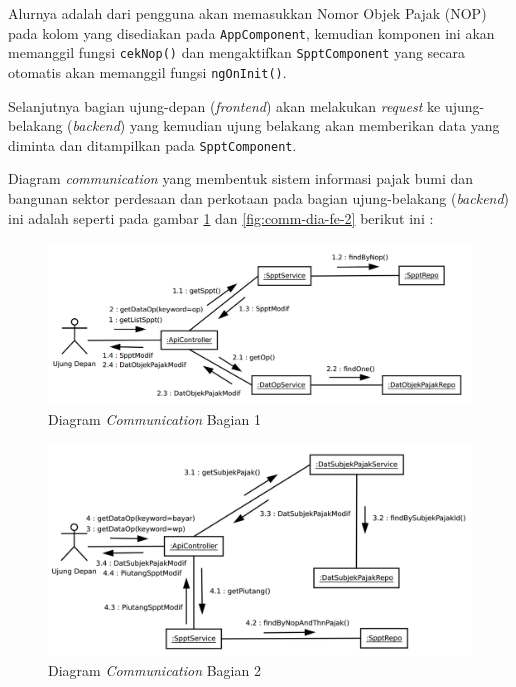 Alurnya adalah dari pengguna akan memasukkan Nomor Objek Pajak (NOP) pada kolom yang disediakan pada \texttt{AppComponent}, kemudian komponen ini akan memanggil fungsi \texttt{cekNop()} dan mengaktifkan \texttt{SpptComponent} yang secara otomatis akan memanggil fungsi \texttt{ngOnInit()}.

Selanjutnya bagian ujung-depan (\textit{frontend}) akan melakukan \textit{request} ke ujung-belakang (\textit{backend}) yang kemudian ujung belakang akan memberikan data yang diminta dan ditampilkan pada \texttt{SpptComponent}.

Diagram \textit{communication} yang membentuk sistem informasi pajak bumi dan bangunan sektor perdesaan dan perkotaan pada bagian ujung-belakang (\textit{backend}) ini adalah seperti pada gambar \ref{fig:comm-dia-be-1} dan \ref{fig:comm-dia-fe-2} berikut ini :

\begin{figure}[H]
	\centering
	\includegraphics[width=1\textwidth]{./resources/uml/comm-dia-1}
	\caption{Diagram \textit{Communication} Bagian 1}
	\label{fig:comm-dia-be-1}
\end{figure}

\begin{figure}[H]
	\centering
	\includegraphics[width=1\textwidth]{./resources/uml/comm-dia-2}
	\caption{Diagram \textit{Communication} Bagian 2}
	\label{fig:comm-dia-be-2}
\end{figure}

